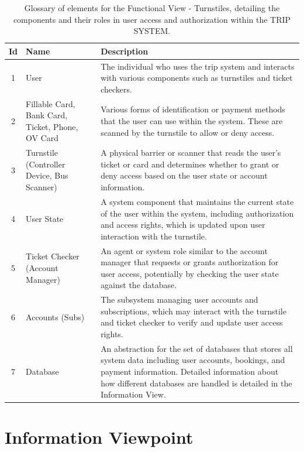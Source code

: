 \begin{table}[H]
    \centering
    \begin{tabular}{@{}clp{9cm}@{}} %
    \toprule
    \textbf{Id} & \textbf{Name} & \textbf{Description} \\
    \midrule
    1 & User & The individual who uses the trip system and interacts with various components such as turnstiles and ticket checkers. \\
    2 & Fillable Card, Bank Card, Ticket, Phone, OV Card & Various forms of identification or payment methods that the user can use within the system. These are scanned by the turnstile to allow or deny access. \\
    3 & Turnstile (Controller Device, Bus Scanner) & A physical barrier or scanner that reads the user's ticket or card and determines whether to grant or deny access based on the user state or account information. \\
    4 & User State & A system component that maintains the current state of the user within the system, including authorization and access rights, which is updated upon user interaction with the turnstile. \\
    5 & Ticket Checker (Account Manager) & An agent or system role similar to the account manager that requests or grants authorization for user access, potentially by checking the user state against the database. \\
    6 & Accounts (Subs) & The subsystem managing user accounts and subscriptions, which may interact with the turnstile and ticket checker to verify and update user access rights. \\
    7 & Database & An abstraction for the set of databases that stores all system data including user accounts, bookings, and payment information. Detailed information about how different databases are handled is detailed in the Information View.\\
    \bottomrule
    \end{tabular}
    \caption{Glossary of elements for the Functional View - Turnstiles, detailing the components and their roles in user access and authorization within the TRIP SYSTEM.}
    \label{tab:glossary_turnstiles}
\end{table}

\section{Information Viewpoint}

